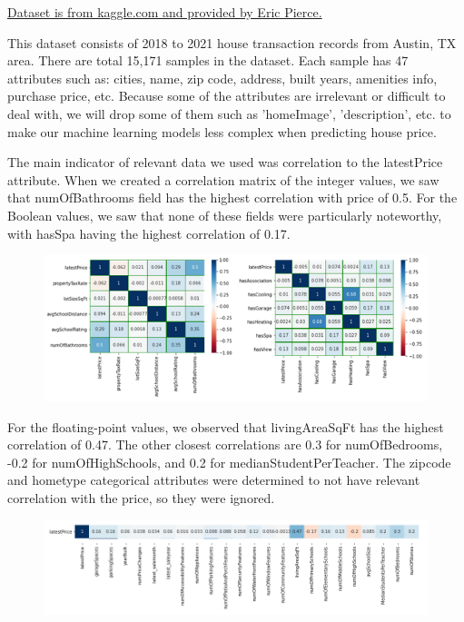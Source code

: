 \documentclass[12pt]{article}
\begin{document}
	\href{https://www.kaggle.com/ericpierce/austinhousingprices}{Dataset is from kaggle.com and provided by Eric Pierce.} 
	
	This dataset consists of 2018 to 2021 house transaction records from Austin, TX area. There are total 15,171 samples in the dataset. Each sample has 47 attributes such as: cities, name, zip code, address, built years, amenities info, purchase price, etc. Because some of the attributes are irrelevant or difficult to deal with, we will drop some of them such as 'homeImage', 'description', etc. to make our machine learning models less complex when predicting house price. 
	
	The main indicator of relevant data we used was correlation to the latestPrice attribute. When we created a correlation matrix of the integer values, we saw that numOfBathrooms field has the highest correlation with price of 0.5. For the Boolean values, we saw that none of these fields were particularly noteworthy, with hasSpa having the highest correlation of 0.17.
	
	\begin{figure}[H]
		\label{fig:fig2}
		\includegraphics[width=1\linewidth]{fig2}
	\end{figure}
	
	For the floating-point values, we observed that livingAreaSqFt has the highest correlation of 0.47. The other closest correlations are 0.3 for numOfBedrooms, -0.2 for numOfHighSchools, and 0.2 for medianStudentPerTeacher. The zipcode and hometype categorical attributes were determined to not have relevant correlation with the price, so they were ignored.
	
	\begin{figure}[H]
		\label{fig:fig3}
		\includegraphics[width=1\linewidth]{fig3recreate}
	\end{figure}
	
\end{document}
